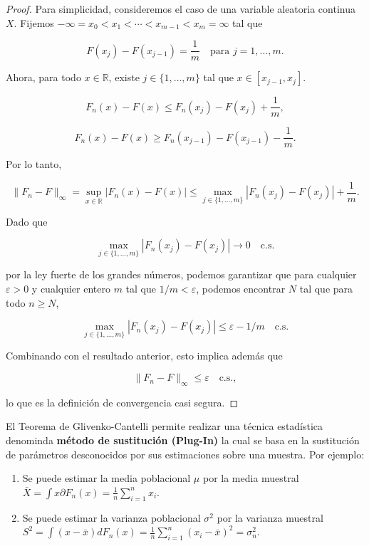 \begin{proof}
	Para simplicidad, consideremos el caso de una variable aleatoria continua \( X \). Fijemos \( -\infty = x_0 < x_1 < \cdots < x_{m-1} < x_m = \infty \) tal que 

	\[
	F(x_j) - F(x_{j-1}) = \frac{1}{m} \quad \text{para } j = 1, \dots, m.
	\]
	
	Ahora, para todo \( x \in \mathbb{R} \), existe \( j \in \{1, \dots, m\} \) tal que \( x \in [x_{j-1}, x_j] \).
	
	\[
	F_n(x) - F(x) \leq F_n(x_j) - F(x_j) + \frac{1}{m},
	\]
	
	\[
	F_n(x) - F(x) \geq F_n(x_{j-1}) - F(x_{j-1}) - \frac{1}{m}.
	\]
	
	Por lo tanto,
	
	\[
	\|F_n - F\|_{\infty} = \sup_{x \in \mathbb{R}} |F_n(x) - F(x)| \leq \max_{j \in \{1, \dots, m\}} |F_n(x_j) - F(x_j)| + \frac{1}{m}.
	\]
	
	Dado que 
	
	\[
	\max_{j \in \{1, \dots, m\}} |F_n(x_j) - F(x_j)| \to 0 \quad \text{c.s.}
	\]
	
	por la ley fuerte de los grandes números, podemos garantizar que para cualquier \( \varepsilon > 0 \) y cualquier entero \( m \) tal que \( 1/m < \varepsilon \), podemos encontrar \( N \) tal que para todo \( n \geq N \),
	
	\[
	\max_{j \in \{1, \dots, m\}} |F_n(x_j) - F(x_j)| \leq \varepsilon - 1/m \quad \text{c.s.}
	\]
	
	Combinando con el resultado anterior, esto implica además que 
	
	\[
	\|F_n - F\|_{\infty} \leq \varepsilon \quad \text{c.s.},
	\]
	
	lo que es la definición de convergencia casi segura.
\end{proof}

\begin{corolario}
	El Teorema de Glivenko-Cantelli permite realizar una técnica estadística denominda \textbf{método de sustitución (Plug-In)} la cual se basa en la sustitución de parámetros desconocidos por sus estimaciones sobre una muestra. Por ejemplo:
	\begin{enumerate}
		\item Se puede estimar la media poblacional $\mu$ por la media muestral $\bar{X} = \int x\partial{F_n(x)} = \frac{1}{n}\sum_{i = 1}^{n}x_i $.
		\item Se puede estimar la varianza poblacional $\sigma^2$ por la varianza muestral $S^2 = \int (x - \bar{x})dF_n(x) = \frac{1}{n}\sum_{i = 1}^{n}(x_i - \bar{x})^2 = \sigma_n^2$.
	\end{enumerate}
\end{corolario}


